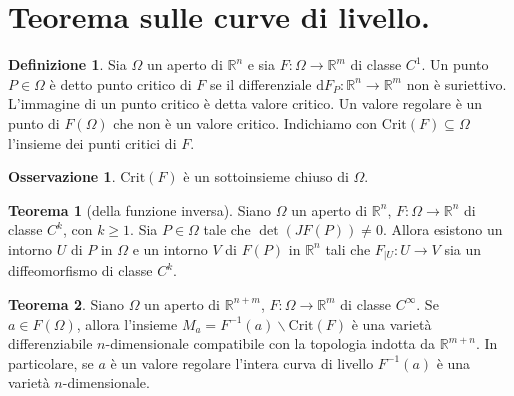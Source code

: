 \documentclass[a4paper,11pt]{article}
\theoremstyle{definition}
\newtheorem{osservazione}{Osservazione}[section]
\newtheorem{definizione}{Definizione}[section]
\theoremstyle{theorem}
\newtheorem{teorema}{Teorema}[section]
\newcommand{\crit}[1]{\mathrm{Crit}(#1)}
\begin{document}
\section{Teorema sulle curve di livello.}
\begin{definizione}
	Sia $\Omega$ un aperto di $\mathbb{R}^n$ e sia $F\colon\Omega\to\mathbb{R}^m$ di classe $C^1$. Un punto $P\in\Omega$ è detto punto critico di $F$ se il differenziale $\mathrm{d}F_P\colon\mathbb{R}^n\to\mathbb{R}^m$ non è suriettivo.
	L'immagine di un punto critico è detta valore critico. Un valore regolare è un punto di $F(\Omega)$ che non è un valore critico. Indichiamo con $\crit{F}\subseteq\Omega$ l'insieme dei punti critici di $F$.
\end{definizione}
\begin{osservazione}
	$\mathrm{Crit}(F)$ è un sottoinsieme chiuso di $\Omega$.
\end{osservazione}
\begin{teorema}[della funzione inversa]
	Siano $\Omega$ un aperto di $\mathbb{R}^n$, $F\colon\Omega\to\mathbb{R}^n$ di classe $C^k$, con $k\geq1$. Sia $P\in\Omega$ tale che $\det(JF(P))\neq0$. Allora esistono un intorno $U$ di $P$ in $\Omega$ e un intorno $V$ di $F(P)$ in $\mathbb{R}^n$ tali che $F_{|U}\colon U\to V$ sia un diffeomorfismo di classe $C^k$.
\end{teorema}
\begin{teorema}
	Siano $\Omega$ un aperto di $\mathbb{R}^{n+m}$, $F\colon\Omega\to\mathbb{R}^m$ di classe $C^\infty$. Se $a\in F(\Omega)$, allora l'insieme $M_a=F^{-1}(a)\backslash\crit{F}$ è una varietà differenziabile $n$-dimensionale compatibile con la topologia indotta da $\mathbb{R}^{m+n}$. In particolare, se $a$ è un valore regolare l'intera curva di livello $F^{-1}(a)$ è una varietà $n$-dimensionale.
\end{teorema}
\end{document}
